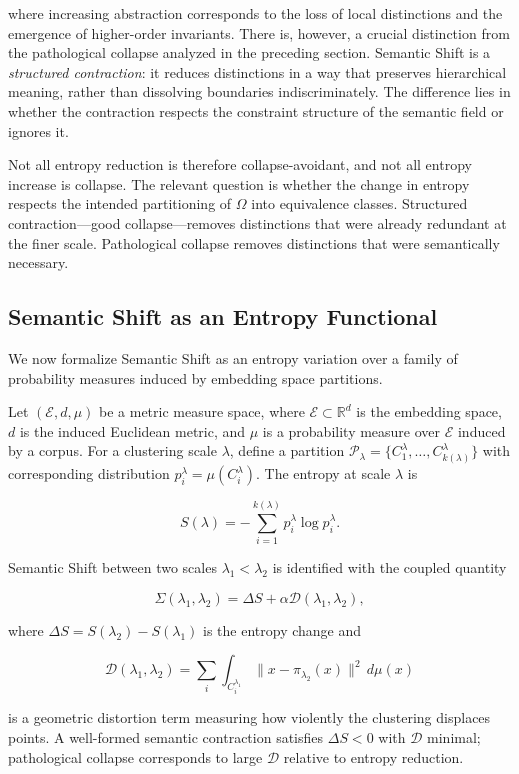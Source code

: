 \documentclass[11pt, twoside]{article}
\theoremstyle{plain}
\theoremstyle{definition}
\theoremstyle{remark}
\begin{document}
where increasing abstraction corresponds to the loss of local distinctions and the emergence of higher-order invariants. There is, however, a crucial distinction from the pathological collapse analyzed in the preceding section. Semantic Shift is a \emph{structured contraction}: it reduces distinctions in a way that preserves hierarchical meaning, rather than dissolving boundaries indiscriminately. The difference lies in whether the contraction respects the constraint structure of the semantic field or ignores it.

Not all entropy reduction is therefore collapse-avoidant, and not all entropy increase is collapse. The relevant question is whether the change in entropy respects the intended partitioning of $\Omega$ into equivalence classes. Structured contraction---good collapse---removes distinctions that were already redundant at the finer scale. Pathological collapse removes distinctions that were semantically necessary.

\subsection{Semantic Shift as an Entropy Functional}

We now formalize Semantic Shift as an entropy variation over a family of probability measures induced by embedding space partitions.

Let $(\mathcal{E}, d, \mu)$ be a metric measure space, where $\mathcal{E} \subset \mathbb{R}^d$ is the embedding space, $d$ is the induced Euclidean metric, and $\mu$ is a probability measure over $\mathcal{E}$ induced by a corpus. For a clustering scale $\lambda$, define a partition $\mathcal{P}_\lambda = \{C_1^\lambda, \dots, C_{k(\lambda)}^\lambda\}$ with corresponding distribution $p_i^\lambda = \mu(C_i^\lambda)$. The entropy at scale $\lambda$ is

\[
S(\lambda) = -\sum_{i=1}^{k(\lambda)} p_i^\lambda \log p_i^\lambda.
\]

Semantic Shift between two scales $\lambda_1 < \lambda_2$ is identified with the coupled quantity

\[
\Sigma(\lambda_1, \lambda_2) = \Delta S + \alpha \mathcal{D}(\lambda_1, \lambda_2),
\]

where $\Delta S = S(\lambda_2) - S(\lambda_1)$ is the entropy change and

\[
\mathcal{D}(\lambda_1, \lambda_2) = \sum_i \int_{C_i^{\lambda_1}} \|x - \pi_{\lambda_2}(x)\|^2 \, d\mu(x)
\]

is a geometric distortion term measuring how violently the clustering displaces points. A well-formed semantic contraction satisfies $\Delta S < 0$ with $\mathcal{D}$ minimal; pathological collapse corresponds to large $\mathcal{D}$ relative to entropy reduction.
\end{document}
